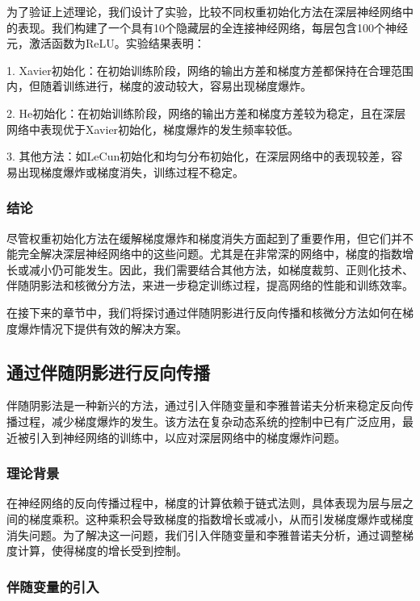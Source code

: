 \documentclass[12pt,a4paper]{amsart}
\begin{document}
为了验证上述理论，我们设计了实验，比较不同权重初始化方法在深层神经网络中的表现。我们构建了一个具有10个隐藏层的全连接神经网络，每层包含100个神经元，激活函数为ReLU。实验结果表明：

1. Xavier初始化：在初始训练阶段，网络的输出方差和梯度方差都保持在合理范围内，但随着训练进行，梯度的波动较大，容易出现梯度爆炸。
   
2. He初始化：在初始训练阶段，网络的输出方差和梯度方差较为稳定，且在深层网络中表现优于Xavier初始化，梯度爆炸的发生频率较低。

3. 其他方法：如LeCun初始化和均匀分布初始化，在深层网络中的表现较差，容易出现梯度爆炸或梯度消失，训练过程不稳定。

\subsubsection{结论}

尽管权重初始化方法在缓解梯度爆炸和梯度消失方面起到了重要作用，但它们并不能完全解决深层神经网络中的这些问题。尤其是在非常深的网络中，梯度的指数增长或减小仍可能发生。因此，我们需要结合其他方法，如梯度裁剪、正则化技术、伴随阴影法和核微分方法，来进一步稳定训练过程，提高网络的性能和训练效率。

在接下来的章节中，我们将探讨通过伴随阴影进行反向传播和核微分方法如何在梯度爆炸情况下提供有效的解决方案。

\subsection{通过伴随阴影进行反向传播}

伴随阴影法是一种新兴的方法，通过引入伴随变量和李雅普诺夫分析来稳定反向传播过程，减少梯度爆炸的发生。该方法在复杂动态系统的控制中已有广泛应用，最近被引入到神经网络的训练中，以应对深层网络中的梯度爆炸问题。

\subsubsection{理论背景}

在神经网络的反向传播过程中，梯度的计算依赖于链式法则，具体表现为层与层之间的梯度乘积。这种乘积会导致梯度的指数增长或减小，从而引发梯度爆炸或梯度消失问题。为了解决这一问题，我们引入伴随变量和李雅普诺夫分析，通过调整梯度计算，使得梯度的增长受到控制。

\subsubsection{伴随变量的引入}
\end{document}
